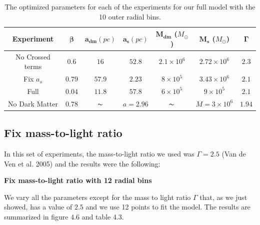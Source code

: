 \begin{table}[H]
\begin{center}
\begin{tabular}{| c| c| c| c| c| c| c|}
    \hline
    \textbf{Experiment} & $\mathbf{\beta}$ & $\mathbf{a_{dm}} (pc)$ & $\mathbf{a_{s}} (pc)$ & $\mathbf{M_{dm}}$ ($M_{\odot}$) & $\mathbf{M_{s}}$ ($M_{\odot}$) & $\mathbf{\Gamma}$\\ \hline
	No Crossed terms & $0.6$ &	$16$ &	$52.8$ &	$2.1 \times 10^{6}$ &	$2.72 \times 10^{6}$ &	$2.3$\\ \hline
	Fix $a_s$ &	$0.79$ &	$57.9$ &	$2.23$ &	$8 \times 10^{5}$ &	$3.43 \times 10 ^{6}$ &	$2.1$\\ \hline
	Full &	$0.04$ &	$11.8$ &	$57.8$ &	$6 \times 10^{5}$ &	$9 \times 10^{5}$ &	$2.1$\\ \hline
	No Dark Matter &	$0.78$ &	$\thicksim$ & $ a = 2.96$ &	$\thicksim$ & $  M = 3 \times 10^{6}$ & 	$1.94$\\
    \hline
  \end{tabular} 
\caption[Optimized parameters for our full model with the 10 outer radial bins.]{The optimized parameters for each of the experiments for our full model with the 10 outer radial bins.}
\end{center}
  
\end{table}

\subsection{Fix mass-to-light ratio}

In this set of experiments, the mass-to-light ratio we used was $\Gamma = 2.5$ (Van de Ven et al. 2005) and the results were the following: 

\begin{center}
\textbf{Fix mass-to-light ratio with 12 radial bins}
\end{center}

We vary all the parameters except for the mass to light ratio $\Gamma$ that, as we just showed, has a value of $2.5$ and we use 12 points to fit the model. The results are summarized in figure 4.6 and table 4.3.

